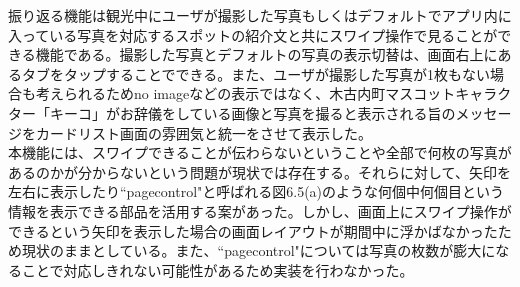 振り返る機能は観光中にユーザが撮影した写真もしくはデフォルトでアプリ内に入っている写真を対応するスポットの紹介文と共にスワイプ操作で見ることができる機能である。撮影した写真とデフォルトの写真の表示切替は、画面右上にあるタブをタップすることでできる。また、ユーザが撮影した写真が1枚もない場合も考えられるためno imageなどの表示ではなく、木古内町マスコットキャラクター「キーコ」がお辞儀をしている画像と写真を撮ると表示される旨のメッセージをカードリスト画面の雰囲気と統一をさせて表示した。\\
本機能には、スワイプできることが伝わらないということや全部で何枚の写真があるのかが分からないという問題が現状では存在する。それらに対して、矢印を左右に表示したり``pagecontrol"と呼ばれる図6.5(a)のような何個中何個目という情報を表示できる部品を活用する案があった。しかし、画面上にスワイプ操作ができるという矢印を表示した場合の画面レイアウトが期間中に浮かばなかったため現状のままとしている。また、``pagecontrol"については写真の枚数が膨大になることで対応しきれない可能性があるため実装を行わなかった。

\newpage

